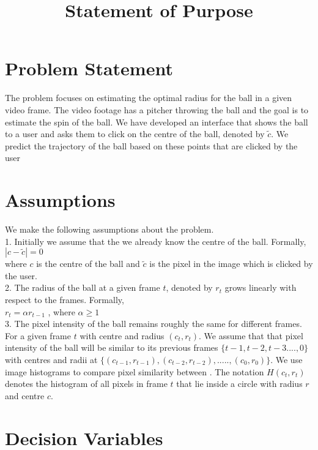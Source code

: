 \documentclass[12pt,a4paper]{article}
\title{Statement of Purpose}
\begin{document}
\section{Problem Statement}
The problem focuses on estimating the optimal radius for the ball in a given video frame. The video footage has a pitcher throwing the ball and the goal is to estimate the spin of the ball. We have developed an interface that shows the ball to a user and asks them to click on the centre of the ball, denoted by $\tilde{c}$. We predict the trajectory of the ball based on these points that are clicked by the user 
\section{Assumptions}
We make the following assumptions about the problem.\\
1. Initially we assume that the we already know the centre of the ball. Formally,\\ 
$|c-\tilde{c}|=0$\\
where $c$ is the centre of the ball and $\tilde{c}$ is the pixel in the image which is clicked by the user.\\
2. The radius of the ball at a given frame $t$, denoted by $r_t$ grows linearly with respect to the frames. Formally, \\
$r_t= \alpha r_{t-1}$ , where $\alpha \geq 1$\\
3. The pixel intensity of the ball remains roughly the same for different frames. For a given frame $t$ with centre and radius $(c_t,r_t)$. We assume that that pixel intensity of the ball will be similar to its previous frames $\{t-1,t-2,t-3....,0 \}$ with centres and radii at $\{(c_{t-1},r_{t-1}),(c_{t-2},r_{t-2}),.....,(c_{0},r_{0})\}$. 
We use image histograms to compare pixel similarity between . The notation $H(c_t,r_t)$ denotes the histogram of all pixels in frame $t$  that lie inside a circle with radius $r$ and centre $c$. 
\section {Decision Variables}
\end{document}
